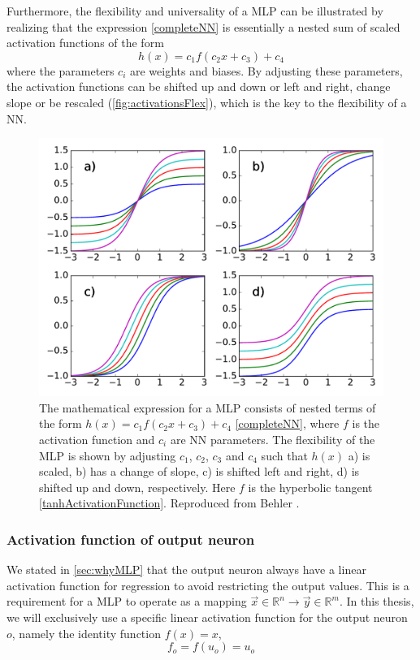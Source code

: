 \documentclass[twoside,english]{uiofysmaster}
\begin{document}
Furthermore, the flexibility and universality of a MLP can be illustrated by realizing that 
the expression \eqref{completeNN} is essentially a nested sum of scaled activation functions of the form
\begin{equation}
 h(x) = c_1 f(c_2 x + c_3) + c_4
\end{equation}
where the parameters $c_i$ are weights and biases. By adjusting these parameters, the activation functions
can be shifted up and down or left and right, change slope or be rescaled (\autoref{fig:activationsFlex}), 
which is the key to the flexibility of a NN. 
\begin{figure}
 \centering
  \includegraphics[width = 0.8\linewidth]{Figures/Theory/activationFlex.pdf}
  \caption{The mathematical expression for a MLP consists of nested terms of the form $h(x) = c_1 f(c_2 x + c_3) + c_4$
           \eqref{completeNN}, where $f$ is the activation function
	    and $c_i$ are NN parameters. The flexibility of the MLP is shown by adjusting $c_1$, $c_2$, $c_3$ and $c_4$ such that
	    $h(x)$ a) is scaled, b) has a change of slope, c) is shifted left and right, d) is shifted up and down, respectively. 
	    Here $f$ is the hyperbolic tangent \eqref{tanhActivationFunction}. Reproduced from Behler \cite{Behler11general}.}
  \label{fig:activationsFlex}
\end{figure}

\subsubsection{Activation function of output neuron}
We stated in \autoref{sec:whyMLP} that the output neuron always have a linear activation function for regression to avoid
restricting the output values. This is a requirement for a MLP to operate as a mapping 
$\vec{x} \in \mathbb{R}^n \rightarrow \vec{y} \in \mathbb{R}^m$. In this thesis, we will exclusively use a
specific linear activation function for the output neuron $o$, namely the identity function $f(x) = x$,
\begin{equation}
 f_o = f(u_o) = u_o
 \label{outputActivation}
\end{equation}
\end{document}
